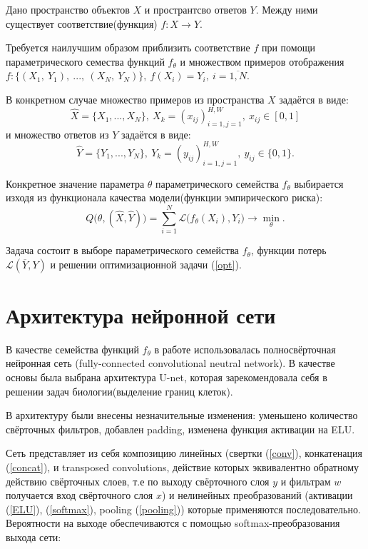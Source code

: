 \documentclass[14pt, a4paper, oneside, bold]{extarticle}
\begin{document}
Дано пространство объектов $X$ и пространтсво ответов $Y$. Между ними существует соответствие(функция) $f: X \rightarrow Y$. 

Требуется наилучшим образом приблизить соответствие $f$ при помощи 
параметрического семества функций $f_{\theta}$ и множеством примеров отображения $f: \{(X_1,\ Y_1),\ ... ,\ (X_N,\ Y_N) \}
	,\ f(X_i) = Y_i ,\ i = \overline{1, N}$.

В конкретном случае множество примеров из пространства $X$ задаётся в виде:
\begin{equation}
	\hat{X} = \{ X_1, ..., X_N \},\ X_k = (x_{ij})_{i=1, j=1}^{H, W}
                       	   ,\ x_{ij} \in [0, 1]
\end{equation}
и множество ответов из $Y$ задаётся в виде:
\begin{equation}
	\hat{Y} = \{ Y_1, ... , Y_N \},\ Y_k = (y_{ij})_{i=1, j=1}^{H, W}
							,\ y_{ij} \in \{ 0, 1 \}.
\end{equation} 

Конкретное значение параметра $\theta$ параметрического семейства $f_{\theta}$ выбирается изходя из функционала качества модели(функции эмпирического риска):
\begin{equation}\label{opt}
	Q \bigl( \theta, (\hat{X}, \hat{Y}) \bigr) = 
		\sum \limits_{i=1}^{N} \mathcal{L} 
		\bigl( f_{\theta}(X_i), Y_i \bigr)
		\longrightarrow \min \limits_{\theta}.
\end{equation}

Задача состоит в выборе параметрического семейства $f_\theta$, 
функции потерь $\mathcal{L}(\overline{Y}, Y)$ и решении 
оптимизационной задачи (\ref{opt}).

\newpage


\section{Архитектура нейронной сети}

В качестве семейства функций $f_{\theta}$ в работе использовалась 
полносвёрточная нейронная сеть (fully-connected convolutional neutral network). В качестве основы была выбрана архитектура U-net, которая зарекомендовала себя в решении задач биологии(выделение границ клеток). 

В архитектуру были внесены незначительные изменения: уменьшено количество свёрточных фильтров, добавлен padding, изменена функция активации на ELU.

Сеть представляет из себя композицию линейных
(свертки (\ref{conv}), конкатенация (\ref{concat}), и transposed convolutions, действие которых эквивалентно обратному действию свёрточных слоев, т.е по выходу свёрточного слоя $y$ и фильтрам $w$ получается вход свёрточного слоя $x$) 
и нелинейных преобразований
(активации (\ref{ELU}), (\ref{softmax}), pooling (\ref{pooling})) которые применяются последовательно. 
Вероятности на выходе обеспечиваются с помощью 
softmax-преобразования выхода сети: 
\end{document}
